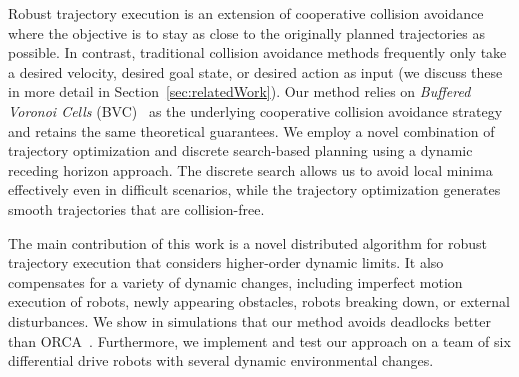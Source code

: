 \documentclass{svproc}
\newcommand{\todo}[1]{\textbf{\textcolor{red}{TODO: #1}}}
\begin{document}
Robust trajectory execution is an extension of cooperative collision avoidance where the objective is to stay as close to the originally planned trajectories as possible.
In contrast, traditional collision avoidance methods frequently only take a desired velocity, desired goal state, or desired action as input (we discuss these in more detail in Section~\ref{sec:relatedWork}).
Our method relies on \emph{Buffered Voronoi Cells} (BVC)~\cite{bufferedVoronoiCells} as the underlying cooperative collision avoidance strategy and retains the same theoretical guarantees.
We employ a novel combination of trajectory optimization and discrete search-based planning using a dynamic receding horizon approach.
The discrete search allows us to avoid local minima effectively even in difficult scenarios, while the trajectory optimization generates smooth trajectories that are collision-free.

The main contribution of this work is a novel distributed algorithm for robust trajectory execution that considers higher-order dynamic limits.
It also compensates for a variety of dynamic changes, including imperfect motion execution of robots, newly appearing obstacles, robots breaking down, or external disturbances.
We show in simulations that our method avoids deadlocks better than ORCA~\cite{orca}.
Furthermore, we implement and test our approach on a team of six differential drive robots with several dynamic environmental changes.

\end{document}
